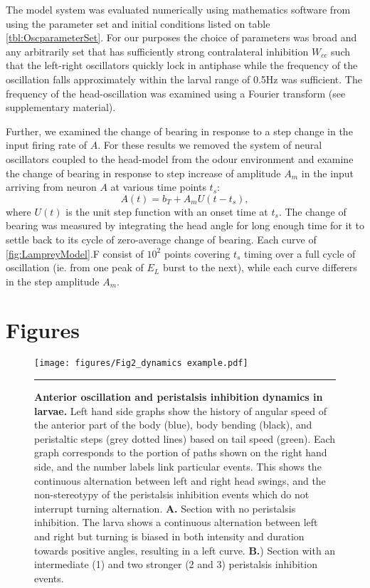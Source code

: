 \documentclass[10pt,a4paper]{article}
\begin{document}
The model system was evaluated numerically using mathematics software from \cite{math}
using the parameter set and initial conditions listed on table \ref{tbl:OscparameterSet}.
 For our purposes the choice of parameters was broad and any arbitrarily set that has sufficiently strong contralateral inhibition $W_{cc}$ such that the left-right oscillators quickly lock in antiphase while the frequency of the oscillation falls approximately within the larval range of 0.5Hz was sufficient. The frequency of the head-oscillation was examined using a Fourier transform (see supplementary material).

Further, we examined the change of bearing in response to a step change in the input firing rate of $A$. For these results we removed the system of neural oscillators coupled to the head-model from the odour environment and examine the change of bearing in response to step increase of amplitude $A_m$ in the input arriving from neuron $A$ at various time points $t_s$:
\begin{equation}
A(t) = b_T + A_m U(t-t_s),
\end{equation}
where $U(t)$ is the unit step function with an onset time at $t_s$. The change of bearing was measured by integrating the head angle for long enough time for it to settle back to its cycle of zero-average change of bearing. Each curve of \ref{fig:LampreyModel}.F consist of $10^2$ points covering $t_s$ timing over a full cycle of oscillation (ie. from one peak of $E_L$ burst to the next), while each curve differers in the step amplitude $A_m$.


\newpage
\section{Figures}


\begin{figure}[!ht]
\begin{center}
\texttt{[image: figures/Fig2\_dynamics example.pdf]}
\caption{{\bf Anterior oscillation and peristalsis inhibition dynamics in larvae.} 
Left hand side graphs show the history of angular speed of the anterior part of the body (blue), body bending (black), and peristaltic steps (grey dotted lines) based on tail speed (green). Each graph corresponds to the portion of paths shown on the right hand side, and the number labels link particular events. This shows the continuous alternation between left and right head swings, and the non-stereotypy of the peristalsis inhibition events which do not interrupt turning alternation.
{\bf A.} Section with no peristalsis inhibition. The larva shows a continuous alternation between left and right but turning is biased in both intensity and duration towards positive angles, resulting in a left curve.
{\bf B.}) Section with an intermediate (1) and two stronger (2 and 3) peristalsis inhibition events.
\label{fig:Fig2}
}
\hrule
\end{center}
\end{figure}
\end{document}
